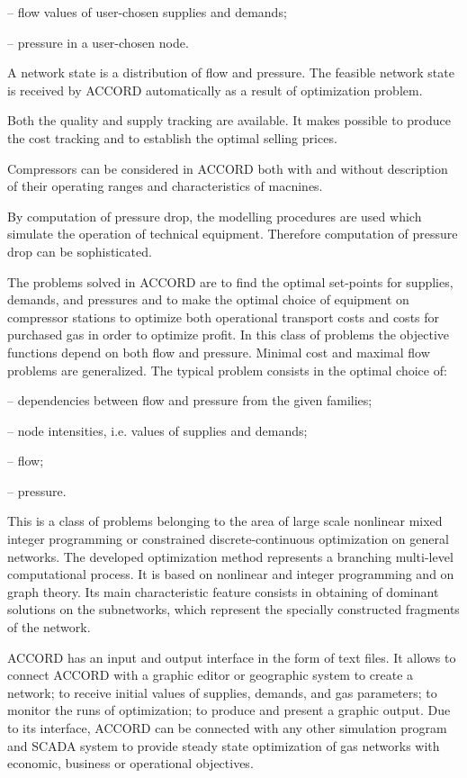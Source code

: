 \documentclass{article}
\begin{document}
\qquad -- flow values of user-chosen supplies and demands;

\qquad -- pressure in a user-chosen node.

A network state is a distribution of flow and pressure. The feasible network
state is received by ACCORD automatically as a result of optimization
problem.

Both the quality and supply tracking are available. It makes possible to
produce the cost tracking and to establish the optimal selling prices.

Compressors can be considered in ACCORD both with and without description of
their operating ranges and characteristics of macnines.

By computation of pressure drop, the modelling procedures are used which
simulate the operation of technical equipment. Therefore computation of
pressure drop can be sophisticated.

The problems solved in ACCORD are to find the optimal set-points for
supplies, demands, and pressures and to make the optimal choice of equipment
on compressor stations to optimize both operational transport costs and
costs for purchased gas in order to optimize profit. In this class of
problems the objective functions depend on both flow and pressure. Minimal
cost and maximal flow problems are generalized. The typical problem consists
in the optimal choice of:

\qquad -- dependencies between flow and pressure from the given families;

\qquad -- node intensities, i.e. values of supplies and demands;

\qquad -- flow;

\qquad -- pressure.

This is a class of problems belonging to the area of large scale nonlinear
mixed integer programming or constrained discrete-continuous optimization on
general networks. The developed optimization method represents a branching
multi-level computational process. It is based on nonlinear and integer
programming and on graph theory. Its main characteristic feature consists in
obtaining of dominant solutions on the subnetworks, which represent the
specially constructed fragments of the network.

ACCORD has an input and output interface in the form of text files. It
allows to connect ACCORD with a graphic editor or geographic system to
create a network; to receive initial values of supplies, demands, and gas
parameters; to monitor the runs of optimization; to produce and present a
graphic output. Due to its interface, ACCORD can be connected with any other
simulation program and SCADA system to provide steady state optimization of
gas networks with economic, business or operational objectives.
\end{document}
